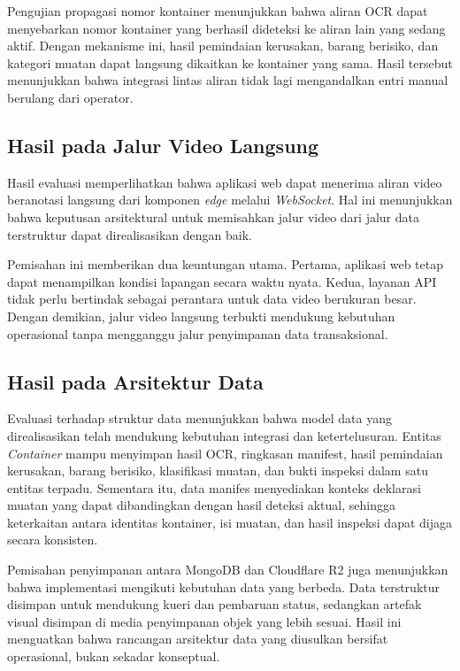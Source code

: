 Pengujian propagasi nomor kontainer menunjukkan bahwa aliran OCR dapat
menyebarkan nomor kontainer yang berhasil dideteksi ke aliran lain yang sedang
aktif. Dengan mekanisme ini, hasil pemindaian kerusakan, barang berisiko, dan
kategori muatan dapat langsung dikaitkan ke kontainer yang sama. Hasil tersebut
menunjukkan bahwa integrasi lintas aliran tidak lagi mengandalkan entri manual
berulang dari operator.

\subsection{Hasil pada Jalur Video Langsung}
\label{subsec:hasil-jalur-video}

Hasil evaluasi memperlihatkan bahwa aplikasi web dapat menerima aliran video
beranotasi langsung dari komponen \textit{edge} melalui \textit{WebSocket}. Hal
ini menunjukkan bahwa keputusan arsitektural untuk memisahkan jalur video dari
jalur data terstruktur dapat direalisasikan dengan baik.

Pemisahan ini memberikan dua keuntungan utama. Pertama, aplikasi web tetap dapat
menampilkan kondisi lapangan secara waktu nyata. Kedua, layanan API tidak perlu
bertindak sebagai perantara untuk data video berukuran besar. Dengan demikian,
jalur video langsung terbukti mendukung kebutuhan operasional tanpa mengganggu
jalur penyimpanan data transaksional.

\subsection{Hasil pada Arsitektur Data}
\label{subsec:hasil-arsitektur-data}

Evaluasi terhadap struktur data menunjukkan bahwa model data yang direalisasikan
telah mendukung kebutuhan integrasi dan ketertelusuran. Entitas \textit{Container}
mampu menyimpan hasil OCR, ringkasan manifest, hasil pemindaian kerusakan,
barang berisiko, klasifikasi muatan, dan bukti inspeksi dalam satu entitas
terpadu. Sementara itu, data manifes menyediakan konteks deklarasi muatan yang
dapat dibandingkan dengan hasil deteksi aktual, sehingga keterkaitan antara
identitas kontainer, isi muatan, dan hasil inspeksi dapat dijaga secara
konsisten.

Pemisahan penyimpanan antara MongoDB dan Cloudflare R2 juga menunjukkan bahwa
implementasi mengikuti kebutuhan data yang berbeda. Data terstruktur disimpan
untuk mendukung kueri dan pembaruan status, sedangkan artefak visual disimpan
di media penyimpanan objek yang lebih sesuai. Hasil ini menguatkan bahwa
rancangan arsitektur data yang diusulkan bersifat operasional, bukan sekadar
konseptual.

